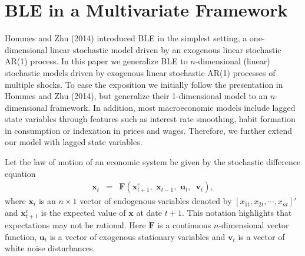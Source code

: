 \section{BLE in a Multivariate Framework}
\label{sect:ble_multi}
Hommes and Zhu (2014) introduced BLE in the simplest setting, a one-dimensional linear stochastic model driven by an exogenous linear stochastic AR(1) process. In this paper we generalize BLE to  $n$-dimensional (linear) stochastic models driven by exogenous linear stochastic AR(1) processes of multiple shocks. To ease the exposition we initially follow the presentation in Hommes and Zhu (2014), but generalize their 1-dimensional model to an $n$-dimensional framework. In addition, most macroeconomic models include lagged state variables through features such as interest rate smoothing, habit formation in consumption or indexation in prices and wages. Therefore, we further extend our model with lagged state variables.

Let the law of motion of an economic system be given by the stochastic difference equation
\begin{eqnarray}\label{xl}
{\pmb x}_t&=&{\pmb F}({\pmb x}_{t+1}^e,\,\,{\pmb x}_{t-1},\,\, {\pmb u}_t,\,\,\,{\pmb v}_t),
\end{eqnarray}
where ${\pmb x}_t$ is an $n\times1$ vector of endogenous variables denoted by
$[x_{1t},x_{2t},\cdots,x_{nt}]'$ and ${\pmb x}_{t+1}^e$ is the
expected value of $\pmb x$ at date $t+1$. This notation highlights that
expectations may not be rational. Here $\pmb F$ is a continuous
$n$-dimensional vector function, ${\pmb u}_t$ is a vector of exogenous stationary variables and %
$\pmb v_t$ is a vector of white noise disturbances.


